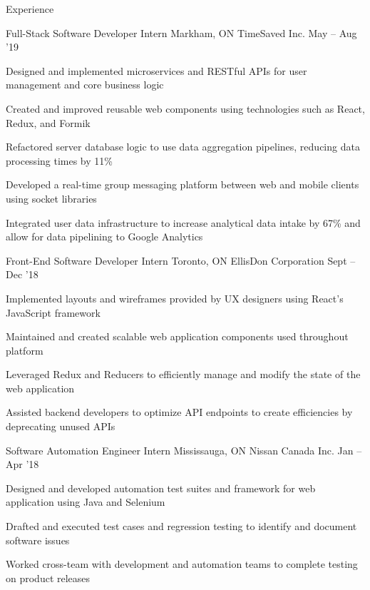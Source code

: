 \documentclass{resume} %
\begin{document}
\begin{rSection}{Experience}
  \begin{rWorkSection}
    {Full-Stack Software Developer Intern}
    {\textnormal{Markham, ON}}
    {TimeSaved Inc.}
    {May -- Aug '19}
    \item Designed and implemented microservices and RESTful APIs for user management and core business logic
    \item Created and improved reusable web components using technologies such as React, Redux, and Formik
    \item Refactored server database logic to use data aggregation pipelines, reducing data processing times by 11{\%} 
    \item Developed a real-time group messaging platform between web and mobile clients using socket libraries
    \item Integrated user data infrastructure to increase analytical data intake by 67{\%} and allow for data pipelining to Google Analytics
  \end{rWorkSection}

    \vspace{-0.1em}

    \begin{rWorkSection}{Front-End Software Developer Intern}
                      {\textnormal{Toronto, ON}}
                      {EllisDon Corporation}
                      {Sept -- Dec '18}
    \item Implemented layouts and wireframes provided by UX designers using React's JavaScript framework
    \item Maintained and created scalable web application components used throughout platform
    \item Leveraged Redux and Reducers to efficiently manage and modify the state of the web application
    \item Assisted backend developers to optimize API endpoints to create efficiencies by deprecating unused APIs
  \end{rWorkSection}

    \vspace{-0.1em}

  \begin{rWorkSection}{Software Automation Engineer Intern}
                     {\textnormal{Mississauga, ON}}
                     {Nissan Canada Inc.}
                     {Jan -- Apr '18}
    \item Designed and developed automation test suites and framework for web application using Java and Selenium
    \item Drafted and executed test cases and regression testing to identify and document software issues
    \item Worked cross-team with development and automation teams to complete testing on product releases
  \end{rWorkSection}
  \vspace{-0.1em}
\end{rSection}
\end{document}
